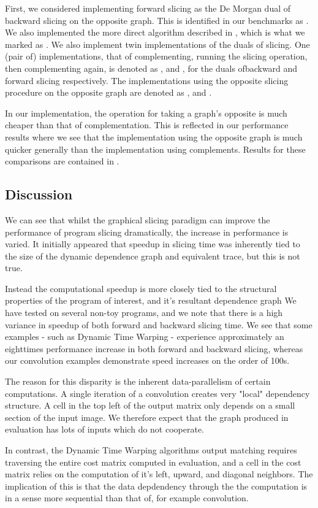 First, we considered implementing forward slicing as the De Morgan dual of backward
slicing on the opposite graph. This is identified in our benchmarks as \NaiveFwd.
We also implemented the more direct algorithm described in , which
is what we marked as \GraphFwd. We also implement twin implementations of the 
duals of slicing. One (pair of) implementations, that of complementing, running the slicing
operation, then complementing again, is denoted as \GraphBwdCmp, and \GraphFwdCmp,
for the duals ofbackward and forward slicing respectively. The implementations
using the opposite slicing procedure on the opposite graph are denoted as 
\GraphBwdOp, and \GraphFwdOp. 

In our implementation, the operation for taking a graph's opposite is much
cheaper than that of complementation. This is reflected in our performance
results where we see that the implementation using the opposite graph is much
quicker generally than the implementation using complements. Results for these
comparisons are contained in .

{\tiny}

\subsection{Discussion}
We can see that whilst the graphical slicing paradigm can improve the performance
of program slicing dramatically, the increase in performance is varied. It 
initially appeared that speedup in slicing time was inherently tied to the
size of the dynamic dependence graph and equivalent trace, but this is not true.

Instead the computational speedup is more closely tied to the structural 
properties of the program of interest, and it's resultant dependence graph
We have tested on several non-toy programs, and we note that there is a 
high variance in speedup of both forward and backward slicing time. We see that
some examples - such as Dynamic Time Warping - experience approximately an
eighttimes performance increase in both forward and backward slicing, whereas
our convolution examples demonstrate speed increases on the order of 100s.

The reason for this disparity is the inherent data-parallelism of certain
computations. A single iteration of a convolution creates very "local" dependency
structure. A cell in the top left of the output matrix only depends on a small
section of the input image. We therefore expect that the graph produced
in evaluation has lots of inputs which do not cooperate.

In contrast, the Dynamic Time Warping algorithms output matching 
requires traversing the entire cost matrix computed in evaluation, and a cell in
the cost matrix relies on the computation of it's left, upward, and diagonal
neighbors. The implication of this is that the data depdendency through the
the computation is in a sense more sequential than that of, for example
convolution.
{\tiny{}
}
